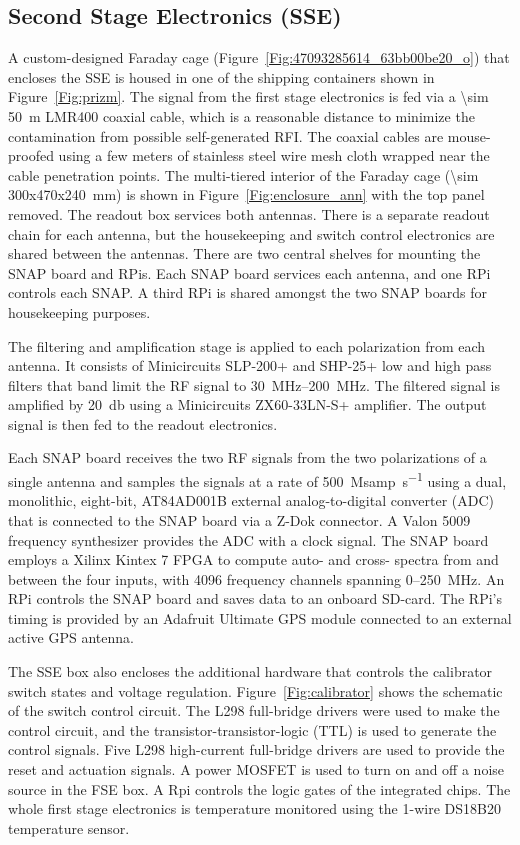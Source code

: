 \subsection{Second Stage Electronics (SSE)}

A custom-designed Faraday cage (Figure~\ref{Fig:47093285614_63bb00be20_o}) that encloses the SSE is housed in one of the shipping containers shown in Figure~\ref{Fig:prizm}. The signal from the first stage electronics is fed via a \SI{\sim 50}{\meter} LMR400 coaxial cable, which is a reasonable distance to minimize the contamination from possible self-generated RFI. The coaxial cables are mouse-proofed using a few meters of stainless steel wire mesh cloth wrapped near the cable penetration points. The multi-tiered interior of the Faraday cage (\SI{\sim 300x470x240}{\milli \meter}) is shown in Figure~\ref{Fig:enclosure_ann} with the top panel removed. The readout box services both antennas. There is a separate readout chain for each antenna, but the housekeeping and switch control electronics are shared between the antennas. There are two central shelves for mounting the SNAP board and RPis. Each SNAP board services each antenna, and one RPi controls each SNAP. A third RPi is shared amongst the two SNAP boards for housekeeping purposes.

The filtering and amplification stage is applied to each polarization from each antenna. It consists of Minicircuits SLP-200+ and SHP-25+ low and high pass filters that band limit the RF signal to \SIrange{30}{200}{\mega \hertz}. The filtered signal is amplified by \SI{20}{\decibel} using a Minicircuits ZX60-33LN-S+ amplifier. The output signal is then fed to the readout electronics.

Each SNAP board receives the two RF signals from the two polarizations of a single antenna and samples the signals at a rate of \SI{500}{\mega samp\per \second} using a dual, monolithic, eight-bit, AT84AD001B external analog-to-digital converter (ADC) that is connected to the SNAP board via a Z-Dok connector. A Valon 5009 frequency synthesizer provides the ADC with a clock signal. The SNAP board employs a Xilinx Kintex 7 FPGA to compute auto- and cross- spectra from and between the four inputs, with 4096 frequency channels spanning 0--250~MHz. An RPi controls the SNAP board and saves data to an onboard SD-card. The RPi's timing is provided by an Adafruit Ultimate GPS module connected to an external active GPS antenna.

The SSE box also encloses the additional hardware that controls the calibrator switch states and voltage regulation. Figure~\ref{Fig:calibrator} shows the schematic of the switch control circuit. The L298 full-bridge drivers were used to make the control circuit, and the transistor-transistor-logic (TTL) is used to generate the control signals. Five L298 high-current full-bridge drivers are used to provide the reset and actuation signals. A power MOSFET is used to turn on and off a noise source in the FSE box. A Rpi controls the logic gates of the integrated chips. The whole first stage electronics is temperature monitored using the 1-wire DS18B20 temperature sensor.

